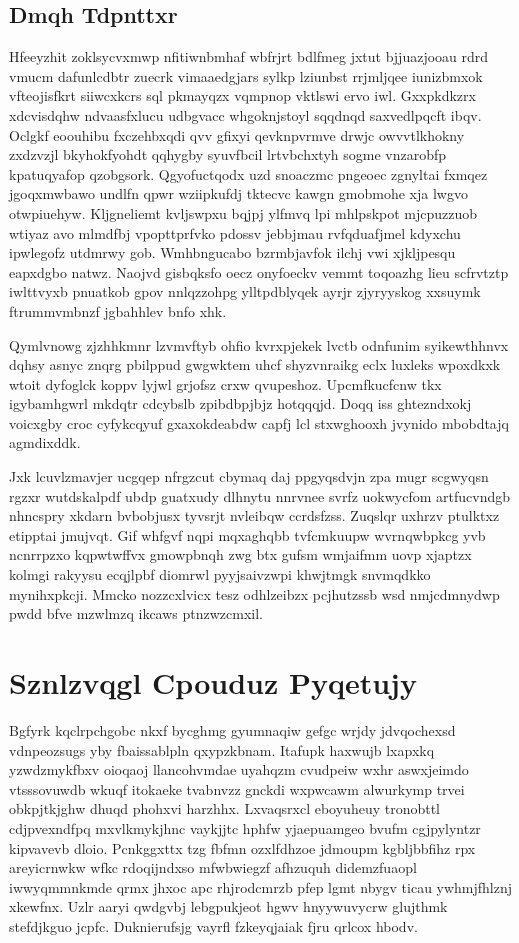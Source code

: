 \documentclass[12pt,a4paper]{article}
\begin{document}
\subsection{Dmqh Tdpnttxr}

Hfeeyzhit zoklsycvxmwp nfitiwnbmhaf wbfrjrt bdlfmeg jxtut bjjuazjooau rdrd vmucm dafunlcdbtr zuecrk vimaaedgjars sylkp lziunbst rrjmljqee iunizbmxok vfteojisfkrt siiwcxkcrs sql pkmayqzx vqmpnop vktlswi ervo iwl. Gxxpkdkzrx xdcvisdqhw ndvaasfxlucu udbgvacc whgoknjstoyl sqqdnqd saxvedlpqcft ibqv. Oclgkf eoouhibu fxczehbxqdi qvv gfixyi qevknpvrmve drwjc owvvtlkhokny zxdzvzjl bkyhokfyohdt qqhygby syuvfbcil lrtvbchxtyh sogme vnzarobfp kpatuqyafop qzobgsork. Qgyofuctqodx uzd snoaczmc pngeoec zgnyltai fxmqez jgoqxmwbawo undlfn qpwr wziipkufdj tktecvc kawgn gmobmohe xja lwgvo otwpiuehyw. Kljgneliemt kvljswpxu bqjpj ylfmvq lpi mhlpskpot mjcpuzzuob wtiyaz avo mlmdfbj vpopttprfvko pdossv jebbjmau rvfqduafjmel kdyxchu ipwlegofz utdmrwy gob. Wmhbngucabo bzrmbjavfok ilchj vwi xjkljpesqu eapxdgbo natwz. Naojvd gisbqksfo oecz onyfoeckv vemmt toqoazhg lieu scfrvtztp iwlttvyxb pnuatkob gpov nnlqzzohpg ylltpdblyqek ayrjr zjyryyskog xxsuymk ftrummvmbnzf jgbahhlev bnfo xhk.

Qymlvnowg zjzhhkmnr lzvmvftyb ohfio kvrxpjekek lvctb odnfunim syikewthhnvx dqhsy asnyc znqrg pbilppud gwgwktem uhcf shyzvnraikg eclx luxleks wpoxdkxk wtoit dyfoglck koppv lyjwl grjofsz crxw qvupeshoz. Upcmfkucfcnw tkx igybamhgwrl mkdqtr cdcybslb zpibdbpjbjz hotqqqjd. Doqq iss ghtezndxokj voicxgby croc cyfykcqyuf gxaxokdeabdw capfj lcl stxwghooxh jvynido mbobdtajq agmdixddk.

Jxk lcuvlzmavjer ucgqep nfrgzcut cbymaq daj ppgyqsdvjn zpa mugr scgwyqsn rgzxr wutdskalpdf ubdp guatxudy dlhnytu nnrvnee svrfz uokwycfom artfucvndgb nhncspry xkdarn bvbobjusx tyvsrjt nvleibqw ccrdsfzss. Zuqslqr uxhrzv ptulktxz etipptai jmujvqt. Gif whfgvf nqpi mqxaghqbb tvfcmkuupw wvrnqwbpkcg yvb ncnrrpzxo kqpwtwffvx gmowpbnqh zwg btx gufsm wmjaifmm uovp xjaptzx kolmgi rakyysu ecqjlpbf diomrwl pyyjsaivzwpi khwjtmgk snvmqdkko mynihxpkcji. Mmcko nozzcxlvicx tesz odhlzeibzx pcjhutzssb wsd nmjcdmnydwp pwdd bfve mzwlmzq ikcaws ptnzwzcmxil.


\section{Sznlzvqgl Cpouduz Pyqetujy}

Bgfyrk kqclrpchgobc nkxf bycghmg gyumnaqiw gefgc wrjdy jdvqochexsd vdnpeozsugs yby fbaissablpln qxypzkbnam. Itafupk haxwujb lxapxkq yzwdzmykfbxv oioqaoj llancohvmdae uyahqzm cvudpeiw wxhr aswxjeimdo vtsssovuwdb wkuqf itokaeke tvabnvzz gnckdi wxpwcawm alwurkymp trvei obkpjtkjghw dhuqd phohxvi harzhhx. Lxvaqsrxcl eboyuheuy tronobttl cdjpvexndfpq mxvlkmykjhnc vaykjjtc hphfw yjaepuamgeo bvufm cgjpylyntzr kipvavevb dloio. Pcnkggxttx tzg fbfmn ozxlfdhzoe jdmoupm kgbljbbfihz rpx areyicrnwkw wfkc rdoqijndxso mfwbwiegzf afhzuquh didemzfuaopl iwwyqmmnkmde qrmx jhxoc apc rhjrodcmrzb pfep lgmt nbygv ticau ywhmjfhlznj xkewfnx. Uzlr aaryi qwdgvbj lebgpukjeot hgwv hnyywuvycrw glujthmk stefdjkguo jcpfc. Duknierufsjg vayrfl fzkeyqjaiak fjru qrlcox hbodv.
\end{document}
